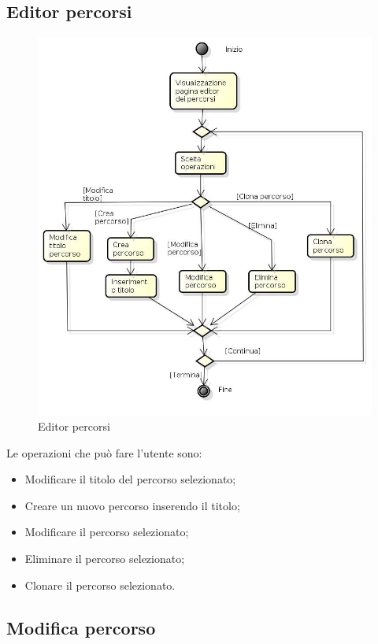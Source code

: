 \subsection{Editor percorsi}

\begin{figure}[h!]
		\centering
		\includegraphics[scale=.5]{img/Editor_percorsi.jpg}
		\caption{Editor percorsi}
		\label{fig:Editor_percorsi}
\end{figure}

Le operazioni che può fare l'utente sono:
\begin{itemize}
\item Modificare il titolo del percorso selezionato;
\item Creare un nuovo percorso inserendo il titolo;
\item Modificare il percorso selezionato;
\item Eliminare il percorso selezionato; 
\item Clonare il percorso selezionato.
\end{itemize}

\newpage

\subsection{Modifica percorso}

